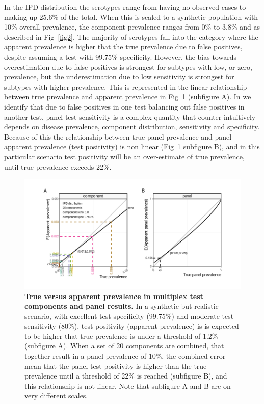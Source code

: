 \documentclass[10pt,letterpaper]{article}
\begin{document}
In the IPD distribution the serotypes range from having no observed cases to making up 25.6\% of the total\cite{hyams2023a}. When this is scaled to a synthetic population with 10\% overall prevalence, the component prevalence ranges from 0\% to 3.8\% and as described in Fig~\ref{fig2}. The majority of serotypes fall into the category where the apparent prevalence is higher that the true prevalence due to false positives, despite assuming a test with 99.75\% specificity. However, the bias towards overestimation due to false positives is strongest for subtypes with low, or zero, prevalence, but the underestimation due to low sensitivity is strongest for subtypes with higher prevalence. This is represented in the linear relationship between true prevalence and apparent prevalence in Fig~\ref{fig3} (subfigure A). In  we identify that due to false positives in one test balancing out false positives in another test, panel test sensitivity is a complex quantity that counter-intuitively depends on disease prevalence, component distribution, sensitivity and specificity. Because of this the relationship between true panel prevalence and panel apparent prevalence (test positivity) is non linear (Fig~\ref{fig3} subfigure B), and in this particular scenario test positivity will be an over-estimate of true prevalence, until true prevalence exceeds 22\%.

\begin{figure}[h!]
\centerline{\includegraphics{fig/true-apparent-prevalence-component-panels.pdf}}
\caption{{\bf True versus apparent prevalence in multiplex test components and panel results.}
In a synthetic but realistic scenario, with excellent test specificity (99.75\%) and moderate test sensitivity (80\%), test positivity (apparent prevalence) is is expected to be higher that true prevalence is under a threshold of 1.2\% (subfigure A). When a set of 20 components are combined, that together result in a panel prevalence of 10\%, the combined error mean that the panel test positivity is higher than the true prevalence until a threshold of 22\% is reached (subfigure B), and this relationship is not linear. Note that subfigure A and B are on very different scales.
}
\label{fig3}
\end{figure}
\end{document}
